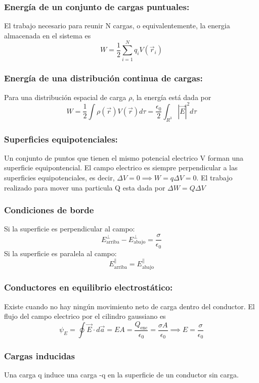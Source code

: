 \documentclass[a4paper, 10pt]{article}
\begin{document}
\begin{multicols*}{2}
	\subsubsection{Energía de un conjunto de cargas puntuales:}
	El trabajo necesario para reunir N cargas, o equivalentemente, la energia almacenada en el sistema es
	$$W=\frac{1}{2} \sum _{i=1}^N q_iV(\vec{r}_i)$$
	\subsubsection{Energía de una distribución continua de cargas:}
	Para una distribución espacial de carga $\rho$, la energía está dada por
	$$W = \frac{1}{2} \int \rho(\vec{r}) V(\vec{r}) d\tau = \frac{\epsilon_0}{2} \int_{R^3} |\vec{E}|^2 d\tau$$
	    
	\subsubsection{Superficies equipotenciales: }Un conjunto de puntos que tienen el mismo potencial electrico V forman una superficie equipontencial. El campo electrico es siempre perpendicular a las superficies equipotenciales, es decir, $\Delta V=0 \implies W=q \Delta V=0$. El trabajo realizado para mover una particula Q esta dada por $\Delta W = Q \Delta V$
	    
	\subsubsection{Condiciones de borde}
	Si la superficie es perpendicular al campo:
	$$E_{\text{arriba}}^{\perp} - E _{\text{abajo}}^{\perp}=\frac{\sigma}{\epsilon_0}$$
	Si la superficie es paralela al campo:
	$$E_{\text{arriba}}^{\parallel}=E_{\text{abajo}}^{\parallel}$$
	    
	\subsubsection{Conductores en equilibrio electrostático:} Existe cuando no hay ningún movimiento neto de carga dentro del conductor.
	El flujo del campo electrico por el cilindro gaussiano es 
	$$\psi _E = \oint\vec{E}\cdot d\vec{a}=EA=\frac{Q_{\text{enc}}}{\epsilon_0}=\frac{\sigma A}{\epsilon_0} \implies E=\frac{\sigma}{\epsilon_0}$$
	    
	\subsubsection{Cargas inducidas}
	Una carga q induce una carga -q en la superficie de un conductor sin carga.
	    

\end{multicols*}
\end{document}

